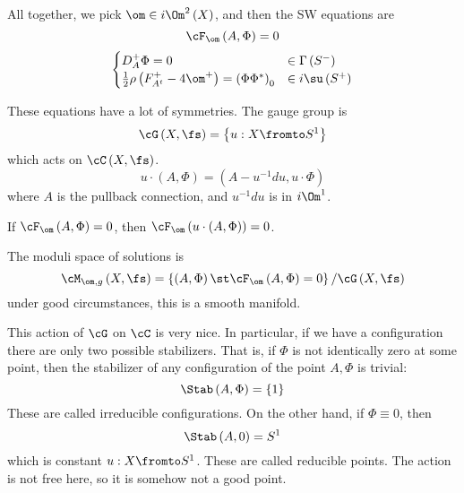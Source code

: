 \documentclass{amsart}
\begin{document}
All together, we pick $\om\in i\Om^2\left( X \right)$, and then the SW equations are
\begin{equation}
\cF_\om\left( A , \Phi \right) = 0
\end{equation}
\begin{equation}
\begin{cases}
D_A^+ \Phi = 0 &
\in \Gamma\left( S^{-} \right) \\
\frac{1}{2}
\rho\left( F_{A^t}^+ - 4\om^+ \right) = \left( \Phi \Phi^* \right)_0
& \in i \su\left( S^+ \right)
\end{cases}
\end{equation}

These equations have a lot of symmetries. 
The gauge group is
\begin{equation}
\cG\left( X , \fs \right) = \left\{ u:X\fromto S^1\right\}
\end{equation}
which acts on $\cC\left( X , \fs \right)$.
\begin{equation}
u\cdot  \left( A , \Phi \right) = 
\left( A - u^{-1} du , u\cdot \Phi \right)
\end{equation}
where $A$ is the pullback connection, and $u^{-1} du$ is in $i \Om^1$.

\begin{exr}
If $\cF_\om\left( A , \Phi \right) = 0$, then
$\cF_\om\left( u\cdot \left( A , \Phi \right) \right) = 0$. 
\end{exr}

The moduli space of solutions is
\begin{equation}
\cM_{ \om , g}\left( X , \fs \right) = 
\left\{ \left( A , \Phi \right) \st \cF_\om\left( A , \Phi \right) = 0 \right\} / 
\cG\left( X , \fs \right)
\end{equation}
under good circumstances, this is a smooth manifold.

This action of $\cG$ on $\cC$ is very nice.
In particular, if we have a configuration
there are only two possible stabilizers. 
That is, if $\Phi$ is not identically zero at some point, then the stabilizer of any
configuration of the point $A,\Phi$ is trivial:
\begin{equation}
\Stab\left( A , \Phi \right)= \left\{ 1 \right\}
\end{equation}
These are called irreducible configurations.
On the other hand, if $\Phi \equiv 0$, then
\begin{equation}
\Stab\left( A , 0 \right) = S^1
\end{equation}
which is constant $u: X\fromto S^1$.
These are called reducible points.
The action is not free here, so it is somehow not a good point.
\end{document}
